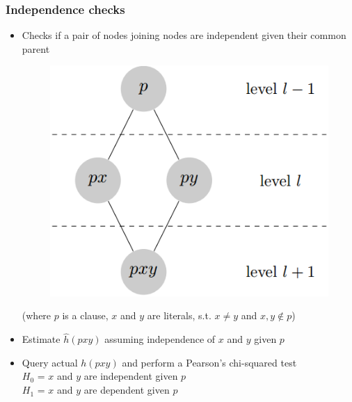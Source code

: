 \documentclass{beamer}
\begin{document}
\begin{frame}
\frametitle{Independence checks}
  \begin{itemize}
   \item Checks if a pair of nodes joining nodes are independent given their common parent
      \begin{figure}
      \includegraphics[height=0.35\textheight]{./Figures/indep}
      \end{figure}
      \begin{center}
        \small (where $p$ is a clause, $x$ and $y$ are literals, s.t. $x \neq y$ and $x,y \not \in p$)

      \end{center}
    \normalsize  
    \item Estimate $\hat{h}(pxy)$ assuming independence of $x$ and $y$ given $p$
    \item Query actual $h(pxy)$ and perform a Pearson's chi-squared test \\ \quad
	  $H_0$ = $x$ and $y$ are independent given $p$ \\ \quad
	  $H_1$ = $x$ and $y$ are dependent given $p$
  \end{itemize}
\end{frame}
\end{document}
